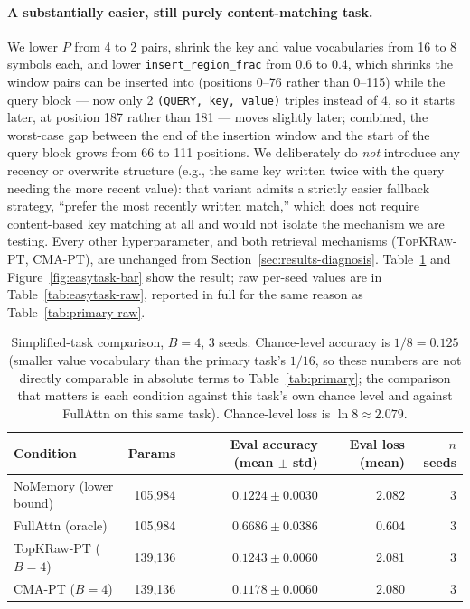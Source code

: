 \documentclass[11pt]{article}
\begin{document}
\paragraph{A substantially easier, still purely content-matching task.} We lower $P$ from 4 to 2
pairs, shrink the key and value vocabularies from 16 to 8 symbols each, and lower
\texttt{insert\_region\_frac} from 0.6 to 0.4, which shrinks the window pairs can be inserted into
(positions 0--76 rather than 0--115) while the query block --- now only 2
\texttt{(QUERY, key, value)} triples instead of 4, so it starts later, at position 187 rather than
181 --- moves slightly later; combined, the worst-case gap between the end of the insertion
window and the start of the query block grows from 66 to 111 positions. We deliberately do
\emph{not} introduce any recency or overwrite structure (e.g., the same key written twice with the
query needing the more recent value): that variant admits a strictly easier fallback strategy,
``prefer the most recently written match,'' which does not require content-based key matching at
all and would not isolate the mechanism we are testing. Every other hyperparameter, and both
retrieval mechanisms (\textsc{TopKRaw-PT}, \textsc{CMA-PT}), are unchanged from
Section~\ref{sec:results-diagnosis}. Table~\ref{tab:easytask} and Figure~\ref{fig:easytask-bar}
show the result; raw per-seed values are in Table~\ref{tab:easytask-raw}, reported in full for the
same reason as Table~\ref{tab:primary-raw}.

\begin{table}[H]
\centering
\small
\begin{tabular}{lrrrr}
\toprule
Condition & Params & Eval accuracy (mean $\pm$ std) & Eval loss (mean) & $n$ seeds \\
\midrule
NoMemory (lower bound) & 105{,}984 & $0.1224 \pm 0.0030$ & 2.082 & 3 \\
FullAttn (oracle) & 105{,}984 & $0.6686 \pm 0.0386$ & 0.604 & 3 \\
TopKRaw-PT ($B{=}4$) & 139{,}136 & $0.1243 \pm 0.0060$ & 2.081 & 3 \\
CMA-PT ($B{=}4$) & 139{,}136 & $0.1178 \pm 0.0060$ & 2.080 & 3 \\
\bottomrule
\end{tabular}
\caption{Simplified-task comparison, $B{=}4$, 3 seeds. Chance-level accuracy is $1/8{=}0.125$
(smaller value vocabulary than the primary task's $1/16$, so these numbers are not directly
comparable in absolute terms to Table~\ref{tab:primary}; the comparison that matters is each
condition against this task's own chance level and against FullAttn on this same task).
Chance-level loss is $\ln 8 \approx 2.079$.}
\label{tab:easytask}
\end{table}
\end{document}
